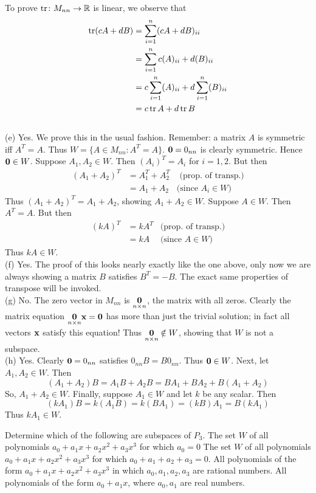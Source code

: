 \begin{solution}
To prove $\operatorname{tr}\colon M_{nn}\rightarrow{\mathbb R}$ is linear, we observe that 
\begin{align*}
\operatorname{tr}(cA+dB)&=\sum_{i=1}^n (cA+dB)_{ii}\\
&=\sum_{i=1}^n c(A)_{ii}+d(B)_{ii}\\
&=c\sum_{i=1}^n(A)_{ii}+d\sum_{i=1}^n(B)_{ii}\\
&=c\operatorname{tr} A+d\operatorname{tr} B
\end{align*} 
\ \\
(e) Yes. We prove this in the usual fashion. Remember: a matrix $A$ is symmetric iff $A^T=A$. Thus $W=\{A\in M_{nn}\colon A^T=A\}$. 
\bb[(i)]
\ii ${\mathbf 0}=0_{nn}$ is clearly symmetric. Hence ${\mathbf 0}\in W$. 
\ii Suppose $A_1,A_2\in W$. Then $(A_i)^T=A_i$ for $i=1,2$. But then 
\begin{align*}
(A_1+A_2)^T&=A_1^T+A_2^T &\text{ (prop. of transp.)}\\
&=A_1+A_2 &\text{(since $A_i\in W$)}
\end{align*}
Thus $(A_1+A_2)^T=A_1+A_2$, showing $A_1+A_2\in W$. 
\ii Suppose $A\in W$. Then $A^T=A$. But then 
\begin{align*}
(kA)^T&=kA^T &\text{(prop. of transp.)}\\
&=kA &\text{(since $A\in W$)}
\end{align*}
Thus $kA\in W$. 
\ee
\ \\
(f) Yes. The proof of this looks nearly exactly like the one above, only now we are always showing a matrix $B$ satisfies $B^T=-B$. The exact same properties of transpose will be invoked. 
\ \\
(g) No. The zero vector in $M_{nn}$ is $\underset{n\times n}{{\mathbf 0}}$, the matrix with all zeros. Clearly the matrix equation  $\underset{n\times n}{{\mathbf 0}}{\mathbf x}={\mathbf 0}$ has more than just the trivial solution; in fact all vectors ${\mathbf x}$ satisfy this equation! Thus $\underset{n\times n}{{\mathbf 0}}\notin W$, showing that $W$ is not a subspace. 
\ \\
(h) Yes.
\bb[(i)]
\ii Clearly ${\mathbf 0}=0_{nn}$ satisfies $0_{nn}B=B0_{nn}$. Thus ${\mathbf 0}\in W$. 
\ii Next, let $A_1,A_2 \in W$. Then
$$
(A_1+A_2)B = A_1B +A_2B = BA_1+BA_2 + B(A_1+A_2)
$$
So, $A_1 + A_2 \in W$. 
\ii Finally, suppose $A_1\in W$ and let $k$ be any scalar. Then
$$
(kA_1)B = k(A_1B) = k(BA_1) = (kB)A_1 = B(kA_1)
$$
Thus $kA_1 \in W$.
\ee
\end{solution}
\ii Determine which of the following are subspaces of $P_3$.
\bb
\ii The set $W$ of all polynomials $a_0+a_1x+a_2x^2+a_3x^3$ for which $a_0 = 0$
\ii The set $W$ of all polynomials $a_0+a_1x+a_2x^2+a_3x^3$ for which $a_0 + a_1 + a_2 + a_3 = 0$.
\ii All polynomials of the form $a_0+a_1x+a_2x^2+a_3x^3$ in which $a_0,a_1,a_2,a_3$ are rational numbers.
\ii All polynomials of the form $a_0 +a_1x$, where $a_0,a_1$ are real numbers.

